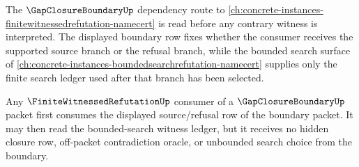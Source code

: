 The $\GapClosureBoundaryUp$ dependency route to \autoref{ch:concrete-instances-finitewitnessedrefutation-namecert} is read before any contrary witness is interpreted. The displayed boundary row fixes whether the consumer receives the supported source branch or the refusal branch, while the bounded search surface of \autoref{ch:concrete-instances-boundedsearchrefutation-namecert} supplies only the finite search ledger used after that branch has been selected.

\begin{lemma}\label{lem:gap-closure-boundary-finite-witnessed-refutation-route}
Any $\FiniteWitnessedRefutationUp$ consumer of a $\GapClosureBoundaryUp$ packet first consumes the displayed source/refusal row of the boundary packet. It may then read the bounded-search witness ledger, but it receives no hidden closure row, off-packet contradiction oracle, or unbounded search choice from the boundary.
\end{lemma}
